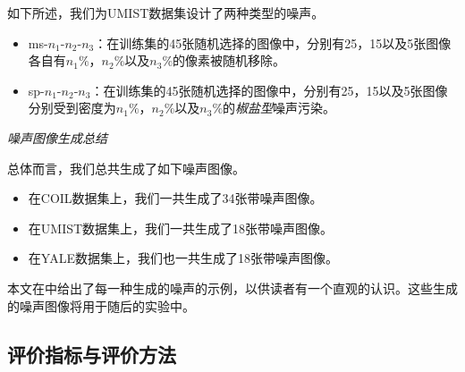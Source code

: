 如下所述，我们为UMIST数据集设计了两种类型的噪声。
\begin{itemize}
    \item ms-$n_{1}\text{-}n_{2}\text{-}n_{3}$：在训练集的45张随机选择的图像中，分别有25，15以及5张图像各自有$n_{1}\%$，$n_{2}\%$以及$n_{3}\%$的像素被随机移除。
    \item sp-$n_{1}\text{-}n_{2}\text{-}n_{3}$：在训练集的45张随机选择的图像中，分别有25，15以及5张图像分别受到密度为$n_{1}\%$，$n_{2}\%$以及$n_{3}\%$的\emph{椒盐型}噪声污染。
\end{itemize}
\noindent\emph{噪声图像生成总结}

总体而言，我们总共生成了如下噪声图像。
\begin{itemize}
    \item 在COIL数据集上，我们一共生成了34张带噪声图像。
    \item 在UMIST数据集上，我们一共生成了18张带噪声图像。
    \item 在YALE数据集上，我们也一共生成了18张带噪声图像。
\end{itemize}
本文在中给出了每一种生成的噪声的示例，以供读者有一个直观的认识。这些生成的噪声图像将用于随后的实验中。

\subsection{评价指标与评价方法}



